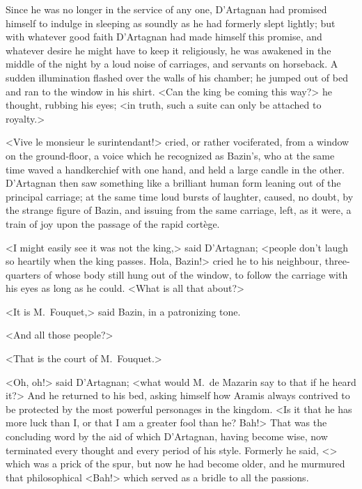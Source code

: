 Since he was no longer in the service of any one, D'Artagnan had promised himself to indulge in sleeping as soundly as he had formerly slept lightly; but with whatever good faith D'Artagnan had made himself this promise, and whatever desire he might have to keep it religiously, he was awakened in the middle of the night by a loud noise of carriages, and servants on horseback. A sudden illumination flashed over the walls of his chamber; he jumped out of bed and ran to the window in his shirt. <Can the king be coming this way?> he thought, rubbing his eyes; <in truth, such a suite can only be attached to royalty.>

<Vive le monsieur le surintendant!> cried, or rather vociferated, from a window on the ground-floor, a voice which he recognized as Bazin's, who at the same time waved a handkerchief with one hand, and held a large candle in the other. D'Artagnan then saw something like a brilliant human form leaning out of the principal carriage; at the same time loud bursts of laughter, caused, no doubt, by the strange figure of Bazin, and issuing from the same carriage, left, as it were, a train of joy upon the passage of the rapid cortège.

<I might easily see it was not the king,> said D'Artagnan; <people don't laugh so heartily when the king passes. Hola, Bazin!> cried he to his neighbour, three-quarters of whose body still hung out of the window, to follow the carriage with his eyes as long as he could. <What is all that about?>

<It is M.~Fouquet,> said Bazin, in a patronizing tone.

<And all those people?>

<That is the court of M.~Fouquet.>

<Oh, oh!> said D'Artagnan; <what would M.~de Mazarin say to that if he heard it?> And he returned to his bed, asking himself how Aramis always contrived to be protected by the most powerful personages in the kingdom. <Is it that he has more luck than I, or that I am a greater fool than he? Bah!> That was the concluding word by the aid of which D'Artagnan, having become wise, now terminated every thought and every period of his style. Formerly he said, <> which was a prick of the spur, but now he had become older, and he murmured that philosophical <Bah!> which served as a bridle to all the passions. 